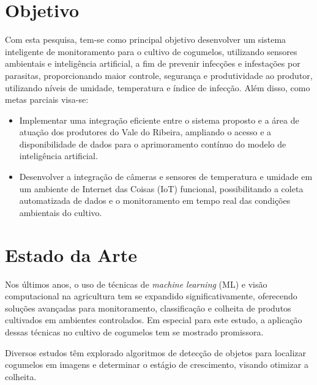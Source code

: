 \documentclass[11pt,a4paper]{article}
\begin{document}
\section{Objetivo}

Com esta pesquisa, tem-se como principal objetivo desenvolver um sistema inteligente de monitoramento para o cultivo de cogumelos, utilizando sensores ambientais e inteligência artificial, a fim de prevenir infecções e infestações por parasitas, proporcionando maior controle, segurança e produtividade ao produtor, utilizando níveis de umidade, temperatura e índice de infecção. Além disso, como metas parciais visa-se:

\begin{itemize}
    \item Implementar uma integração eficiente entre o sistema proposto e a área de atuação dos produtores do Vale do Ribeira, ampliando o acesso e a disponibilidade de dados para o aprimoramento contínuo do modelo de inteligência artificial.
    \item Desenvolver a integração de câmeras e sensores de temperatura e umidade em um ambiente de Internet das Coisas (IoT) funcional, possibilitando a coleta automatizada de dados e o monitoramento em tempo real das condições ambientais do cultivo.
\end{itemize}

\section{Estado da Arte}

Nos últimos anos, o uso de técnicas de \textit{machine learning} (ML) e visão computacional na agricultura tem se expandido significativamente, oferecendo soluções avançadas para monitoramento, classificação e colheita de produtos cultivados em ambientes controlados. Em especial para este estudo, a aplicação dessas técnicas no cultivo de cogumelos tem se mostrado promissora.

Diversos estudos têm explorado algoritmos de detecção de objetos para localizar cogumelos em imagens e determinar o estágio de crescimento, visando otimizar a colheita.
\end{document}
